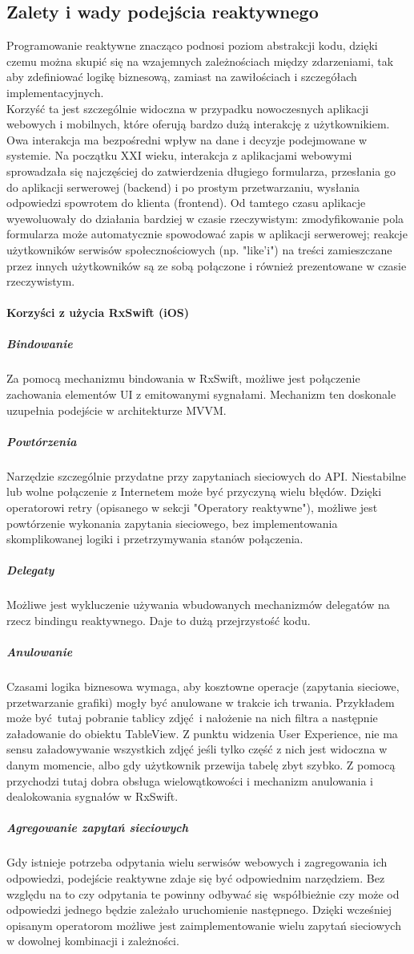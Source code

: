\documentclass[12pt,oneside,a4paper]{report}
\begin{document}
\subsection{Zalety i wady podejścia reaktywnego} 
Programowanie reaktywne znacząco podnosi poziom abstrakcji kodu, dzięki czemu można skupić się na wzajemnych zależnościach między zdarzeniami, tak aby zdefiniować logikę biznesową, zamiast na zawiłościach i szczegółach implementacyjnych.\\
Korzyść ta jest szczególnie widoczna w przypadku nowoczesnych aplikacji webowych i mobilnych, które oferują bardzo dużą interakcję z użytkownikiem. Owa interakcja ma bezpośredni wpływ na dane i decyzje podejmowane w systemie. Na początku XXI wieku, interakcja z aplikacjami webowymi sprowadzała się najczęściej do zatwierdzenia długiego formularza, przesłania go do aplikacji serwerowej (backend) i po prostym przetwarzaniu, wysłania odpowiedzi spowrotem do klienta (frontend). Od tamtego czasu aplikacje wyewoluowały do działania bardziej w czasie rzeczywistym: zmodyfikowanie pola formularza może automatycznie spowodować zapis w aplikacji serwerowej; reakcje użytkowników serwisów społecznościowych (np. "like'i") na treści zamieszczane przez innych użytkowników są ze sobą połączone i również prezentowane w czasie rzeczywistym. 

\paragraph{Korzyści z użycia RxSwift (iOS)}
\subparagraph{Bindowanie } Za pomocą mechanizmu bindowania w RxSwift, możliwe jest połączenie zachowania elementów UI z emitowanymi sygnałami. Mechanizm ten doskonale uzupełnia podejście w architekturze MVVM. 
\subparagraph{Powtórzenia } Narzędzie szczególnie przydatne przy zapytaniach sieciowych do API. Niestabilne lub wolne połączenie z Internetem może być przyczyną wielu błędów. Dzięki operatorowi retry (opisanego w sekcji "Operatory reaktywne"), możliwe jest powtórzenie wykonania zapytania sieciowego, bez implementowania skomplikowanej logiki i przetrzymywania stanów połączenia.
\subparagraph{Delegaty } Możliwe jest wykluczenie używania wbudowanych mechanizmów delegatów na rzecz bindingu reaktywnego. Daje to dużą przejrzystość kodu. 
\subparagraph{Anulowanie } Czasami logika biznesowa wymaga, aby kosztowne operacje (zapytania sieciowe, przetwarzanie grafiki) mogły być anulowane w trakcie ich trwania. Przykładem może być tutaj pobranie tablicy zdjęć i nałożenie na nich filtra a następnie załadowanie do obiektu TableView. Z punktu widzenia User Experience, nie ma sensu załadowywanie wszystkich zdjęć jeśli tylko część z nich jest widoczna w danym momencie, albo gdy użytkownik przewija tabelę zbyt szybko. Z pomocą przychodzi tutaj dobra obsługa wielowątkowości i mechanizm anulowania i dealokowania sygnałów w RxSwift.
\subparagraph{Agregowanie zapytań sieciowych } Gdy istnieje potrzeba odpytania wielu serwisów webowych i zagregowania ich odpowiedzi, podejście reaktywne zdaje się być odpowiednim narzędziem. Bez względu na to czy odpytania te powinny odbywać się współbieżnie czy może od odpowiedzi jednego będzie zależało uruchomienie następnego. Dzięki wcześniej opisanym operatorom możliwe jest zaimplementowanie wielu zapytań sieciowych w dowolnej kombinacji i zależności. 
\end{document}
